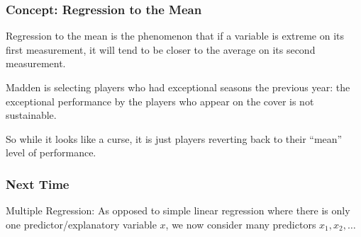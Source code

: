\documentclass[handout]{beamer}
\newcommand{\blue}[1]{\textcolor{blue2}{#1}}
\begin{document}
\begin{frame}[fragile]
\frametitle{Concept: Regression to the Mean}

%
%
\blue{Regression to the mean} is the phenomenon that if a variable is extreme on its first measurement, it will tend to be closer to the average on its second measurement.
\vspace{0.5cm}

\pause Madden is selecting players who had \blue{exceptional} seasons the previous year: the exceptional performance by the players who appear on the cover is \blue{not sustainable}.  

\vspace{0.5cm}

\pause So while it looks like a curse, it is just players reverting back to their ``mean'' level of performance.  

\end{frame}


\begin{frame}[fragile]
\frametitle{Next Time}

Multiple Regression:  As opposed to \blue{simple linear regression} where there is only one predictor/explanatory variable $x$, we now consider \blue{many} predictors $x_1, x_2, \ldots$

\end{frame}
\end{document}
